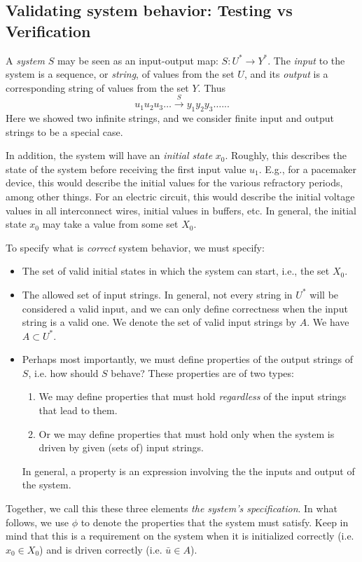 \subsection{Validating system behavior: Testing vs Verification}

\newcommand{\ub}{\bar{u}}
\newcommand{\yb}{\bar{y}}
A \emph{system} $S$ may be seen as an input-output map: $S: U^* \rightarrow Y^*$.
The \emph{input} to the system is a sequence, or \emph{string}, of values from the set $U$, and its \emph{output} is a corresponding string of values from the set $Y$.
Thus
\[u_1u_2u_3 \ldots \stackrel{S}{\rightarrow} y_1 y_2 y_3 \ldots...\]
Here we showed two infinite strings, and we consider finite input and output strings to be a special case. 

In addition, the system will have an \emph{initial state} $x_0$. 
Roughly, this describes the state of the system before receiving the first input value $u_1$. 
E.g., for a pacemaker device, this would describe the initial values for the various refractory periods, among other things.
For an electric circuit, this would describe the initial voltage values in all interconnect wires, initial values in buffers, etc.
In general, the initial state $x_0$ may take a value from some set $X_0$.

To specify what is \emph{correct} system behavior, we must specify:
\begin{itemize}
	\item The set of valid initial states in which the system can start, i.e., the set $X_0$.
	\item The allowed set of input strings. In general, not every string in $U^*$ will be considered a valid input, and we can only define correctness when the input string is a valid one.
	We denote the set of valid input strings by $A$. 
	We have $A \subset U^*$.
	\item Perhaps most importantly, we must define properties of the output strings of $S$, i.e. how should $S$ behave?
	These properties are of two types:
	\begin{enumerate}
		\item We may define properties that must hold \emph{regardless} of the input strings that lead to them. 
		\item Or we may define properties that must hold only when the system is driven by given (sets of) input strings.
	\end{enumerate}
	In general, a property is an expression involving the the inputs and output of the system.
\end{itemize}
Together, we call this these three elements \emph{the system's specification}.
In what follows, we use $\phi$ to denote the properties that the system must satisfy.
Keep in mind that this is a requirement on the system when it is initialized correctly (i.e. $x_0 \in X_0$) and is driven correctly (i.e. $\bar{u} \in A$).

